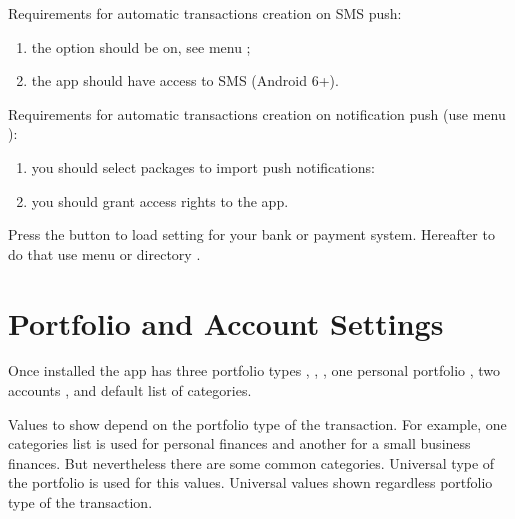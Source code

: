 \documentclass[a4paper,10pt,english]{sphinxmanual}
\begin{document}
\sphinxAtStartPar
Requirements for automatic transactions creation on SMS push:
\begin{enumerate}
%
\item {} 
\sphinxAtStartPar
the option should be on, see menu ;

\item {} 
\sphinxAtStartPar
the app should have access to SMS (Android 6+).

\end{enumerate}

\sphinxAtStartPar
Requirements for automatic transactions creation on notification push (use menu ):
\begin{enumerate}
%
\item {} 
\sphinxAtStartPar
you should select packages to import push notifications:

\item {} 
\sphinxAtStartPar
you should grant access rights to the app.

\end{enumerate}

\sphinxAtStartPar
Press the button  to load setting for your bank or payment system. Hereafter
to do that use menu  or directory
.

\noindent{}
\noindent{}


\section{Portfolio and Account Settings}
\label{\detokenize{getting-started:portfolio-and-account-settings}}
\sphinxAtStartPar
Once installed the app has three portfolio types , , ,
one personal portfolio , two accounts ,  and default list of categories.

\sphinxAtStartPar
Values to show depend on the portfolio type of the transaction.  For example,
one categories list is used for personal finances and another for a small business finances.
But nevertheless there are some common categories. Universal type of the portfolio is used
for this values. Universal values shown regardless portfolio type of the transaction.
\end{document}
